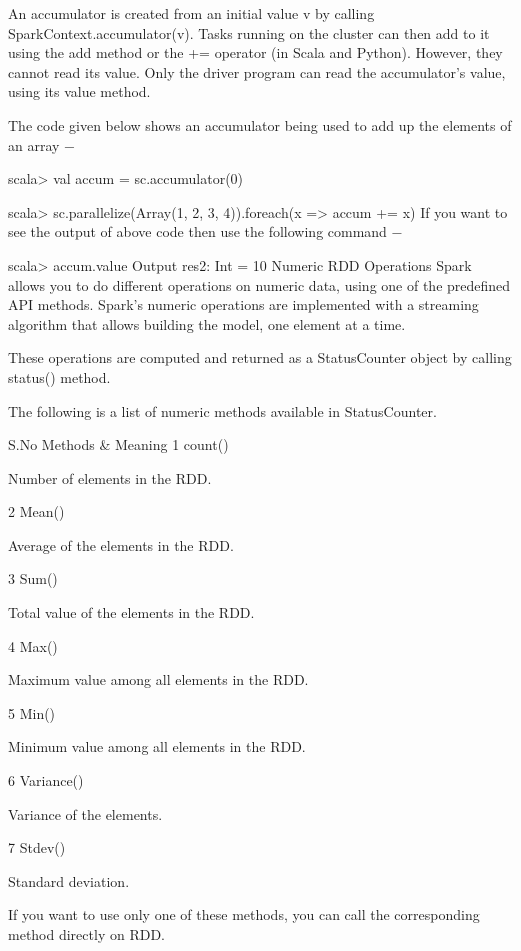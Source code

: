 An accumulator is created from an initial value v by calling SparkContext.accumulator(v). Tasks running on the cluster can then add to it using the add method or the += operator (in Scala and Python). However, they cannot read its value. Only the driver program can read the accumulator’s value, using its value method.

The code given below shows an accumulator being used to add up the elements of an array −

scala> val accum = sc.accumulator(0) 
 
scala> sc.parallelize(Array(1, 2, 3, 4)).foreach(x => accum += x)
If you want to see the output of above code then use the following command −

scala> accum.value 
Output
res2: Int = 10 
Numeric RDD Operations
Spark allows you to do different operations on numeric data, using one of the predefined API methods. Spark’s numeric operations are implemented with a streaming algorithm that allows building the model, one element at a time.

These operations are computed and returned as a StatusCounter object by calling status() method.

The following is a list of numeric methods available in StatusCounter.

S.No	Methods & Meaning
1	
count()

Number of elements in the RDD.

2	
Mean()

Average of the elements in the RDD.

3	
Sum()

Total value of the elements in the RDD.

4	
Max()

Maximum value among all elements in the RDD.

5	
Min()

Minimum value among all elements in the RDD.

6	
Variance()

Variance of the elements.

7	
Stdev()

Standard deviation.

If you want to use only one of these methods, you can call the corresponding method directly on RDD.
